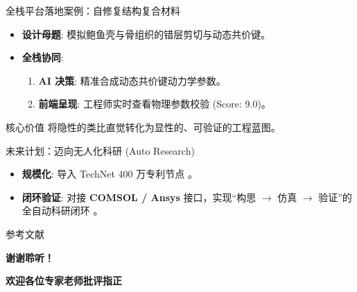 \documentclass[aspectratio=169, 11pt]{ctexbeamer}
\begin{document}
\begin{frame}{全栈平台落地案例：自修复结构复合材料}
    \begin{itemize}
        \item \textbf{设计母题}: 模拟鲍鱼壳与骨组织的错层剪切与动态共价键。
        \item \textbf{全栈协同}: 
        \begin{enumerate}
            \item \textbf{AI 决策}: 精准合成动态共价键动力学参数。
            \item \textbf{前端呈现}: 工程师实时查看物理参数校验 (Score: 9.0)。
        \end{enumerate}
    \end{itemize}
    \vspace{0.3cm}
    \begin{block}{核心价值}
        将隐性的类比直觉转化为显性的、可验证的工程蓝图。
    \end{block}
\end{frame}

\begin{frame}{未来计划：迈向无人化科研 (Auto Research)}
    \begin{itemize}
        \item \textbf{规模化}: 导入 TechNet 400 万专利节点 \cite{liu2025vision}。
        \item \textbf{闭环验证}: 对接 \textbf{COMSOL / Ansys} 接口，实现“构思 $\rightarrow$ 仿真 $\rightarrow$ 验证”的全自动科研闭环 \cite{miao2025paper2agent}。
    \end{itemize}
\end{frame}

\begin{frame}[allowframebreaks]{参考文献}
    \tiny
    
    
\end{frame}

\begin{frame}
    \centering
    \Huge \textbf{谢谢聆听！}
    \vspace{1cm}
    
    \Large \textbf{欢迎各位专家老师批评指正}
\end{frame}
\end{document}
